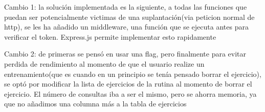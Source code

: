 Cambio 1: la solución implementada es la siguiente, a todas las funciones que puedan ser potencialmente victimas de una suplantación(via peticion normal de http), se les ha añadido un middleware, una función que se ejecuta antes para verificar el token. Express.js permite implementar esto rapidamente

Cambio 2: de primeras se pensó en usar una flag, pero finalmente para evitar perdida de rendimiento al momento de que el usuario realize un entrenamiento(que es cuando en un principio se tenía pensado borrar el ejercicio), se optó por modificar la lista de ejercicios de la rutina al momento de borrar el ejercicio. El número de consultas iba a ser el mismo, pero se ahorra memoria, ya que no añadimos una columna más a la tabla de ejercicios